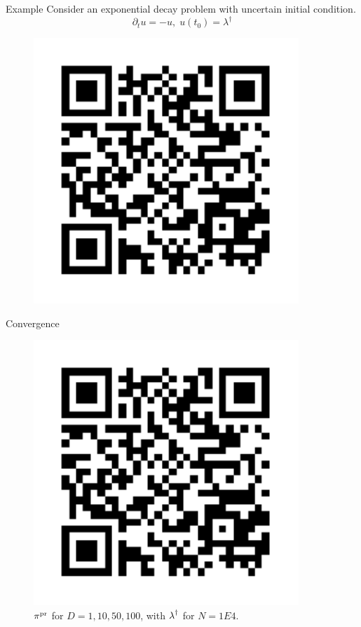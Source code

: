 \begin{block}{Example}
\centering
    Consider an exponential decay problem with uncertain initial condition.
    \begin{equation*}
        \partial_t u = - u, \; u(t_0) = \lambda^\dagger
    \end{equation*}

    \begin{figure}
        \includegraphics[height=10cm]{ref1}
    \end{figure}

\end{block}


\begin{block}{Convergence}
\centering

    \begin{figure}
        \includegraphics[height=10cm]{ref1}
        \caption{$\operatorname*{\pi^{pr}}$ for $D=1, 10,50,100$, with $\operatorname*{\lambda}^\dagger$ for $N=1E4$.}
    \end{figure}

\end{block}


